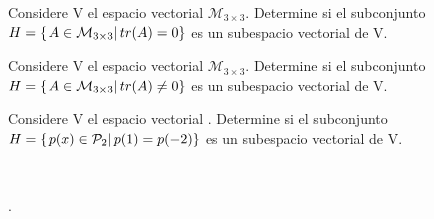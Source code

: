 \begin{enumerate}[1.]
\begin{prob}
Considere V el espacio vectorial $\mathcal{M}_{3\times 3}$. Determine si el subconjunto $H=\left\{ \left. A \in \mathcal{M}_{3\times 3}\right| tr(A)=0 \right\} $ es un subespacio vectorial de V.
\end{prob}
\begin{prob}
Considere V el espacio vectorial $\mathcal{M}_{3\times 3}$. Determine si el subconjunto $H=\left\{ \left. A \in \mathcal{M}_{3\times 3}\right| tr(A)\neq0 \right\} $ es un subespacio vectorial de V.
\end{prob}
\begin{prob}
Considere V el espacio vectorial \pdos. Determine si el subconjunto $H=\left\{ \left. p(x)\in \mathcal{P}_2\right| p(1)=p(-2) \right\} $ es un subespacio vectorial de V.
\end{prob}

~\\

\end{enumerate}
.
